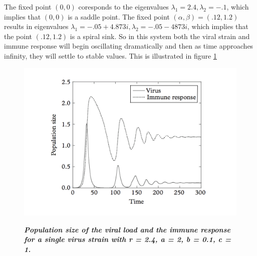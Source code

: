 \documentclass{article}
\begin{document}
The fixed point $(0,0)$ coresponds to the eigenvalues $\lambda_1 = 2.4, \lambda_2 = -.1$, which implies that $(0,0)$ is a saddle point. The fixed point $(\alpha,\beta) = (.12,1.2)$ results in eigenvalues $\lambda_1 = -.05 + 4.873i , \lambda_2 = -.05 - 4873i$, which implies that the point $(.12,1.2)$ is a spiral sink. So in this system both the viral strain and immune response will begin oscillating dramatically and then as time approaches infinity, they will settle to stable values. This is illustrated in figure \ref{fig:hiv1}
\label{sub:Determining Stability of Fixed points}
\begin{figure}[h!]
    \centering
    \caption{\textbf{\textit{Population size of the viral load and the immune response for a single virus strain with r = 2.4, a = 2, b = 0.1, c = 1.}}}
    \includegraphics[scale=.4]{imgs/hiv_graph1.png}
    \label{fig:hiv1}
\end{figure}
\end{document}
